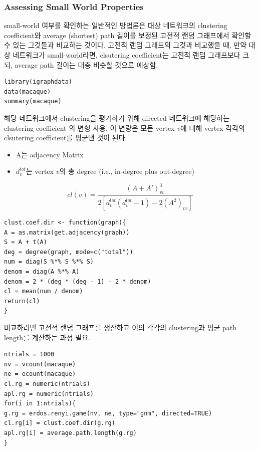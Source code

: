 \documentclass[
]{book}
\providecommand{\tightlist}{%
  \setlength{\itemsep}{0pt}\setlength{\parskip}{0pt}}
\begin{document}
{{{\hypertarget{assessing-small-world-properties}{%
\subsubsection{Assessing Small World Properties}\label{assessing-small-world-properties}}

small-world 여부를 확인하는 일반적인 방법론은 대상 네트워크의 clustering coefficient와 average (shortest) path 길이를 보정된 고전적 랜덤 그래프에서 확인할 수 있는 그것들과 비교하는 것이다. 고전적 랜덤 그래프의 그것과 비교했을 때, 만약 대상 네트워크가 small-world라면, clsutering coefficient는 고전적 랜덤 그래프보다 크되, average path 길이는 대충 비슷할 것으로 예상함.

\begin{verbatim}
library(igraphdata)
data(macaque)
summary(macaque)
\end{verbatim}

해당 네트워크에서 clustering을 평가하기 위해 directed 네트워크에 해당하는 clustering coefficient 의 변형 사용. 이 변량은 모든 vertex \(v\)에 대해 vertex 각각의 clsutering coefficient를 평균낸 것이 된다.

\begin{itemize}
\tightlist
\item
  A는 adjacency Matrix
\item
  \(d_v^{tot}\)는 vertex \(v\)의 총 degree (i.e., in-degree plus out-degree)
\end{itemize}

\[
cl(v) = \frac{\left( A+ A' \right)^3_{vv}}{ 2 \left [ d_v^{tot}(d_v^{tot} - 1) - 2 (A^2)_{vv} \right]}
\]

\begin{verbatim}
clust.coef.dir <- function(graph){
A = as.matrix(get.adjacency(graph))
S = A + t(A)
deg = degree(graph, mode=c("total"))
num = diag(S %*% S %*% S)
denom = diag(A %*% A)
denom = 2 * (deg * (deg - 1) - 2 * denom)
cl = mean(num / denom)
return(cl)
}
\end{verbatim}

비교하려면 고전적 랜덤 그래프를 생산하고 이의 각각의 clustering과 평균 path length를 계산하는 과정 필요.

\begin{verbatim}
ntrials = 1000
nv = vcount(macaque)
ne = ecount(macaque)
cl.rg = numeric(ntrials)
apl.rg = numeric(ntrials)
for(i in 1:ntrials){
g.rg = erdos.renyi.game(nv, ne, type="gnm", directed=TRUE)
cl.rg[i] = clust.coef.dir(g.rg)
apl.rg[i] = average.path.length(g.rg)
}
\end{verbatim}

}}}
\end{document}
